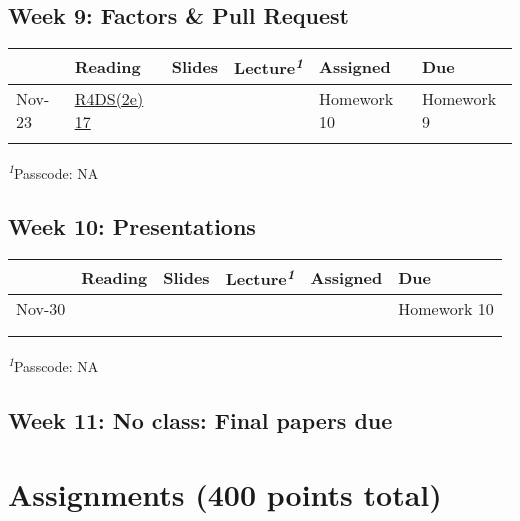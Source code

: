 \documentclass[
  letterpaper,
  DIV=11,
  numbers=noendperiod]{scrartcl}
\begin{document}
\hypertarget{week-9-factors-pull-request}{%
\subsection{Week 9: Factors \& Pull
Request}\label{week-9-factors-pull-request}}

\setlength{\LTpost}{0mm}
\begin{longtable*}{llllll}
\toprule
 & Reading & Slides & Lecture\textsuperscript{\textit{1}} & Assigned & Due \\ 
\midrule\addlinespace[2.5pt]
Nov-23 & \href{https://r4ds.hadley.nz/factors}{R4DS(2e) 17} &  &  & Homework 10 & Homework 9 \\ 
 &  &  &  &  &  \\ 
\bottomrule
\end{longtable*}
\begin{minipage}{\linewidth}
\textsuperscript{\textit{1}}Passcode: NA\\
\end{minipage}

\hypertarget{week-10-presentations}{%
\subsection{Week 10: Presentations}\label{week-10-presentations}}

\setlength{\LTpost}{0mm}
\begin{longtable*}{llllll}
\toprule
 & Reading & Slides & Lecture\textsuperscript{\textit{1}} & Assigned & Due \\ 
\midrule\addlinespace[2.5pt]
Nov-30 &  &  &  &  & Homework 10 \\ 
 &  &  &  &  &  \\ 
 &  &  &  &  &  \\ 
\bottomrule
\end{longtable*}
\begin{minipage}{\linewidth}
\textsuperscript{\textit{1}}Passcode: NA\\
\end{minipage}

\hypertarget{week-11-no-class-final-papers-due}{%
\subsection{Week 11: No class: Final papers
due}\label{week-11-no-class-final-papers-due}}

\hypertarget{assignments-400-points-total}{%
\section{Assignments (400 points
total)}\label{assignments-400-points-total}}
\end{document}
